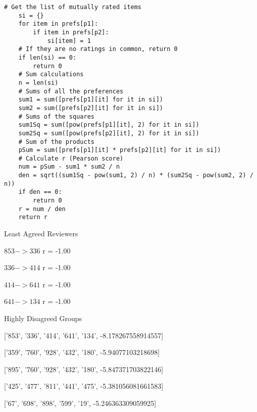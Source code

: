 \begin{flushleft}
\begin{lstlisting}[caption={Correlation between two reviewers}]
    # Get the list of mutually rated items
    si = {}
    for item in prefs[p1]:
        if item in prefs[p2]:
            si[item] = 1
    # If they are no ratings in common, return 0
    if len(si) == 0:
        return 0
    # Sum calculations
    n = len(si)
    # Sums of all the preferences
    sum1 = sum([prefs[p1][it] for it in si])
    sum2 = sum([prefs[p2][it] for it in si])
    # Sums of the squares
    sum1Sq = sum([pow(prefs[p1][it], 2) for it in si])
    sum2Sq = sum([pow(prefs[p2][it], 2) for it in si])
    # Sum of the products
    pSum = sum([prefs[p1][it] * prefs[p2][it] for it in si])
    # Calculate r (Pearson score)
    num = pSum - sum1 * sum2 / n
    den = sqrt((sum1Sq - pow(sum1, 2) / n) * (sum2Sq - pow(sum2, 2) / n))
    if den == 0:
        return 0
    r = num / den
    return r
\end{lstlisting}

\begin{center}
Least Agreed Reviewers

$853 -> 336$ r =  -1.00

$336 -> 414$ r = -1.00

$414 -> 641$ r = -1.00

$641 -> 134$ r = -1.00

\vspace{10pt}

Highly Disagreed Groups

['853', '336', '414', '641', '134', -8.178267558914557]

['359', '760', '928', '432', '180', -5.94077103218698]

['895', '760', '928', '432', '180', -5.847371703822146]

['425', '477', '811', '441', '475', -5.381056081661583]

['67', '698', '898', '599', '19', -5.246363309059925]

\end{center}

\end{flushleft}




